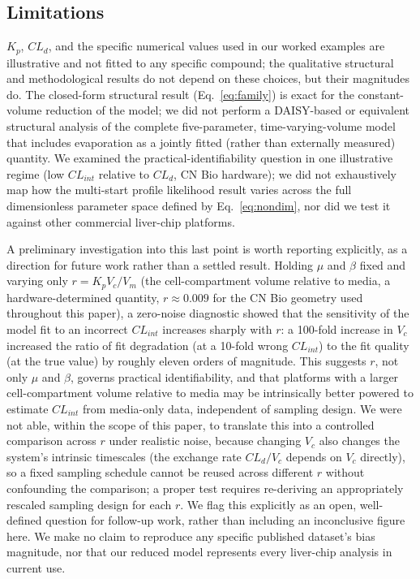 \subsection*{Limitations}

$K_p$, $CL_d$, and the specific numerical values used in our worked examples are illustrative and not fitted to any specific compound; the qualitative structural and methodological results do not depend on these choices, but their magnitudes do. The closed-form structural result (Eq.~\eqref{eq:family}) is exact for the constant-volume reduction of the model; we did not perform a DAISY-based or equivalent structural analysis of the complete five-parameter, time-varying-volume model that includes evaporation as a jointly fitted (rather than externally measured) quantity. We examined the practical-identifiability question in one illustrative regime (low $CL_{int}$ relative to $CL_d$, CN Bio hardware); we did not exhaustively map how the multi-start profile likelihood result varies across the full dimensionless parameter space defined by Eq.~\eqref{eq:nondim}, nor did we test it against other commercial liver-chip platforms.

A preliminary investigation into this last point is worth reporting explicitly, as a direction for future work rather than a settled result. Holding $\mu$ and $\beta$ fixed and varying only $r = K_pV_c/V_m$ (the cell-compartment volume relative to media, a hardware-determined quantity, $r\approx0.009$ for the CN Bio geometry used throughout this paper), a zero-noise diagnostic showed that the sensitivity of the model fit to an incorrect $CL_{int}$ increases sharply with $r$: a 100-fold increase in $V_c$ increased the ratio of fit degradation (at a 10-fold wrong $CL_{int}$) to the fit quality (at the true value) by roughly eleven orders of magnitude. This suggests $r$, not only $\mu$ and $\beta$, governs practical identifiability, and that platforms with a larger cell-compartment volume relative to media may be intrinsically better powered to estimate $CL_{int}$ from media-only data, independent of sampling design. We were not able, within the scope of this paper, to translate this into a controlled comparison across $r$ under realistic noise, because changing $V_c$ also changes the system's intrinsic timescales (the exchange rate $CL_d/V_c$ depends on $V_c$ directly), so a fixed sampling schedule cannot be reused across different $r$ without confounding the comparison; a proper test requires re-deriving an appropriately rescaled sampling design for each $r$. We flag this explicitly as an open, well-defined question for follow-up work, rather than including an inconclusive figure here. We make no claim to reproduce any specific published dataset's bias magnitude, nor that our reduced model represents every liver-chip analysis in current use.
